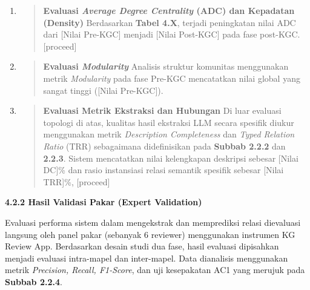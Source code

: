 \documentclass[
]{article}
\begin{document}
\begin{enumerate}
\def\labelenumi{\arabic{enumi}.}
\item
  \begin{quote}
  \textbf{Evaluasi \emph{Average Degree Centrality} (ADC) dan Kepadatan
  (Density)} Berdasarkan \textbf{Tabel 4.X}, terjadi peningkatan nilai
  ADC dari {[}Nilai Pre-KGC{]} menjadi {[}Nilai Post-KGC{]} pada fase
  post-KGC. {[}proceed{]}
  \end{quote}
\item
  \begin{quote}
  \textbf{Evaluasi \emph{Modularity}} Analisis struktur komunitas
  menggunakan metrik \emph{Modularity} pada fase Pre-KGC mencatatkan
  nilai global yang sangat tinggi ({[}Nilai Pre-KGC{]}).
  \end{quote}
\item
  \begin{quote}
  \textbf{Evaluasi Metrik Ekstraksi dan Hubungan} Di luar evaluasi
  topologi di atas, kualitas hasil ekstraksi LLM secara spesifik diukur
  menggunakan metrik \emph{Description Completeness} dan \emph{Typed
  Relation Ratio} (TRR) sebagaimana didefinisikan pada \textbf{Subbab
  2.2.2} dan \textbf{2.2.3}. Sistem mencatatkan nilai kelengkapan
  deskripsi sebesar {[}Nilai DC{]}\% dan rasio instansiasi relasi
  semantik spesifik sebesar {[}Nilai TRR{]}\%, {[}proceed{]}
  \end{quote}
\end{enumerate}

\textbf{4.2.2 Hasil Validasi Pakar (Expert Validation)}

Evaluasi performa sistem dalam mengekstrak dan memprediksi relasi
dievaluasi langsung oleh panel pakar (sebanyak 6 reviewer) menggunakan
instrumen KG Review App. Berdasarkan desain studi dua fase, hasil
evaluasi dipisahkan menjadi evaluasi intra-mapel dan inter-mapel. Data
dianalisis menggunakan metrik \emph{Precision, Recall, F1-Score}, dan
uji kesepakatan AC1 yang merujuk pada \textbf{Subbab 2.2.4}.
\end{document}
